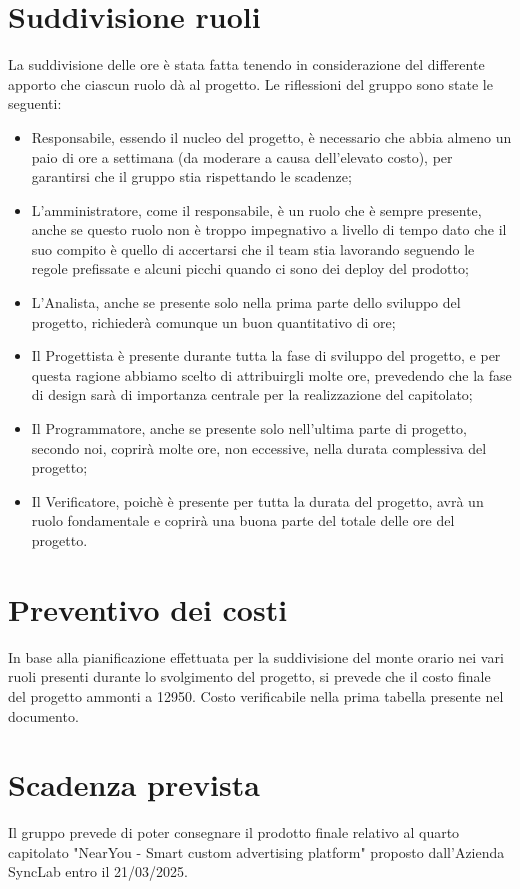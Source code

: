 \documentclass[10pt]{article}
\begin{document}
\section{Suddivisione ruoli}
La suddivisione delle ore è stata fatta tenendo in considerazione del differente apporto che ciascun ruolo dà al progetto. Le riflessioni del gruppo sono state le seguenti:
\begin{itemize}
    \item Responsabile, essendo il nucleo del progetto, è necessario che abbia almeno un paio di ore a settimana (da moderare a causa dell'elevato costo), per garantirsi che il gruppo stia rispettando le scadenze;
    \item L'amministratore, come il responsabile, è un ruolo che è sempre presente, anche se questo ruolo non è troppo impegnativo a livello di tempo dato che il suo compito è quello di accertarsi che il team stia lavorando seguendo le regole prefissate e alcuni picchi quando ci sono dei deploy del prodotto;
    \item L'Analista, anche se presente solo nella prima parte dello sviluppo del progetto, richiederà comunque un buon quantitativo di ore;
    \item Il Progettista è presente durante tutta la fase di sviluppo del progetto, e per questa ragione abbiamo scelto di attribuirgli molte ore, prevedendo che la fase di design sarà di importanza centrale per la realizzazione del capitolato;
    \item Il Programmatore, anche se presente solo nell'ultima parte di progetto, secondo noi, coprirà molte ore, non eccessive, nella durata complessiva del progetto;
    \item Il Verificatore, poichè è presente per tutta la durata del progetto, avrà un ruolo fondamentale e coprirà una buona parte del totale delle ore del progetto.
\end{itemize}


\section{Preventivo dei costi}
In base alla pianificazione effettuata per la suddivisione del monte orario nei vari ruoli presenti durante lo svolgimento del progetto, si prevede che il costo finale del progetto ammonti a 12950\texteuro . Costo verificabile nella prima tabella presente nel documento.
\section{Scadenza prevista}
Il gruppo prevede di poter consegnare il prodotto finale relativo al quarto capitolato "NearYou - Smart custom advertising platform" proposto dall'Azienda SyncLab entro il 21/03/2025.
\end{document}

